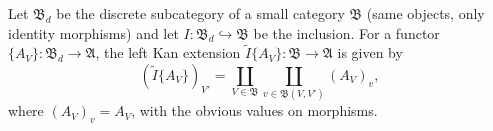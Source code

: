 Let $\mathfrak{B}_d$ be the discrete subcategory of a small category $\mathfrak{B}$ (same objects, only identity morphisms) and let $I: \mathfrak{B}_d \hookrightarrow \mathfrak{B}$ be the inclusion. For a functor $\{A_V\}: \mathfrak{B}_d \rightarrow \mathfrak{A}$, the left Kan extension $\tilde{I}\{A_V\}: \mathfrak{B} \rightarrow \mathfrak{A}$ is given by
$$
(\tilde{I}\{A_V\})_{V'} = \coprod_{V \in \mathfrak{B}} \coprod_{v \in \mathfrak{B}(V, V')} (A_V)_v,
$$
where $(A_V)_v = A_V$, with the obvious values on morphisms.
